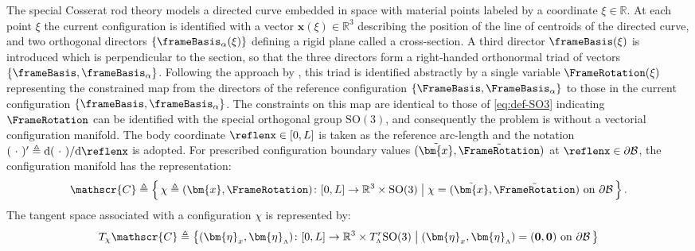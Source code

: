
The special Cosserat rod theory models a directed curve embedded in space
with material points labeled by a coordinate \(\xi\in\mathbb{R}\).
At each point \(\xi\) the current configuration is
identified with a vector \(\bm{x}(\xi)\in\mathbb{R}^3\) describing the
position of the %
line of centroids of the directed curve, and two orthogonal directors
\(\left\{\frameBasis_\alpha(\xi)\right\}\) defining a rigid plane called
a cross-section.
A third director \(\frameBasis(\xi)\) is introduced
which is perpendicular to the section,
so that the three directors form %
a right-handed orthonormal triad of vectors
\(\{\frameBasis, \frameBasis_\alpha\}\).
Following the approach by \cite{simo1985finite}, this triad 
is identified
abstractly by a single variable \(\FrameRotation(\xi)\) representing the
constrained map from the directors of the reference configuration 
\(\left\{\FrameBasis, \FrameBasis_\alpha\right\}\) to those
in the current configuration \(\{\frameBasis, \frameBasis_\alpha\}\).
The constraints on this map are identical to those of \eqref{eq:def-SO3}
indicating \(\FrameRotation\) can be identified with
the special orthogonal group \(\mathrm{SO}(3)\), and consequently the
problem is without a vectorial configuration manifold. 
The body
coordinate \(\reflenx \in[0, L]\) is taken as the reference arc-length and
the notation
\((~\cdot~)^{\prime} \triangleq \mathrm{d}(~\cdot~) / \mathrm{d} \reflenx\) is adopted. For
prescribed configuration boundary values \((\tilde{\bm{x}}, \tilde{\FrameRotation})\) at
\(\reflenx \in \partial\mathcal{B}\), the configuration manifold has the representation:
\begin{equation*}
\mathscr{C} \triangleq \left\{\,
\chi \triangleq (\bm{x}, \FrameRotation) \colon [0, L] \rightarrow \mathbb{R}^3 \times \operatorname{SO}(3)
\bigm|
\chi = (\tilde{\bm{x}}, \tilde{\FrameRotation})
\text{ on } \partial\mathcal{B}
\,\right\}.
\end{equation*}
The tangent space associated with a configuration \(\chi\) is represented by:
\begin{equation*}
T_\chi \mathscr{C} \triangleq \left\{
(\bm{\eta}_x, \bm{\eta}_{\scriptscriptstyle{\Lambda}})\colon [0, L] \rightarrow \mathbb{R}^3 \times T_{\scriptscriptstyle{\Lambda}}^r \mathrm{SO}(3)
\bigm|
(\bm{\eta}_x, \bm{\eta}_{\scriptscriptstyle{\Lambda}})=(\mathbf{0}, \mathbf{0})
\text{ on } \partial\mathcal{B}
\,\right\}
\end{equation*}
